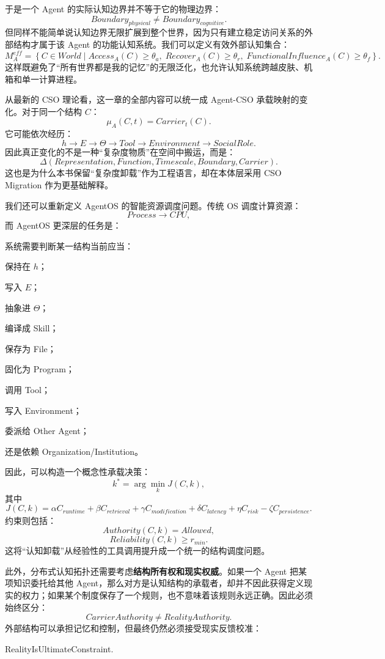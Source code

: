 于是一个 Agent 的实际认知边界并不等于它的物理边界：
\[
Boundary_{physical}
\neq
Boundary_{cognitive}.
\]
但同样不能简单说认知边界无限扩展到整个世界，因为只有建立稳定访问关系的外部结构才属于该 Agent 的功能认知系统。我们可以定义有效外部认知集合：
\[
M_A^{eff}
=
\left\{
C\in World
\mid
Access_A(C)\geq\theta_a,\;
Recover_A(C)\geq\theta_r,\;
FunctionalInfluence_A(C)\geq\theta_f
\right\}.
\]
这样既避免了``所有世界都是我的记忆''的无限泛化，也允许认知系统跨越皮肤、机箱和单一计算进程。

从最新的 CSO 理论看，这一章的全部内容可以统一成 Agent-CSO 承载映射的变化。对于同一个结构 $C$：
\[
\mu_A(C,t)
=
Carrier_t(C).
\]
它可能依次经历：
\[
h
\rightarrow
E
\rightarrow
\Theta
\rightarrow
Tool
\rightarrow
Environment
\rightarrow
SocialRole.
\]
因此真正变化的不是一种``复杂度物质''在空间中搬运，而是：
\[
\boxed{
\Delta
(
Representation,
Function,
Timescale,
Boundary,
Carrier
).
}
\]
这也是为什么本书保留``复杂度卸载''作为工程语言，却在本体层采用 CSO Migration 作为更基础解释。

我们还可以重新定义 AgentOS 的智能资源调度问题。传统 OS 调度计算资源：
\[
Process\rightarrow CPU,
\]
而 AgentOS 更深层的任务是：
\begin{statementbox}
\centering
{}
\end{statementbox}
系统需要判断某一结构当前应当：

保持在 $h$；

写入 $E$；

抽象进 $\Theta$；

编译成 Skill；

保存为 File；

固化为 Program；

调用 Tool；

写入 Environment；

委派给 Other Agent；

还是依赖 Organization/Institution。

因此，可以构造一个概念性承载决策：
\[
k^*
=
\arg\min_k
J(C,k),
\]
其中
\[
J(C,k)
=
\alpha C_{runtime}
+
\beta C_{retrieval}
+
\gamma C_{modification}
+
\delta C_{latency}
+
\eta C_{risk}
-
\zeta C_{persistence}.
\]
约束则包括：
\[
Authority(C,k)=Allowed,
\]
\[
Reliability(C,k)\geq r_{min}.
\]
这将``认知卸载''从经验性的工具调用提升成一个统一的结构调度问题。

此外，分布式认知拓扑还需要考虑\textbf{结构所有权和现实权威}。如果一个 Agent 把某项知识委托给其他 Agent，那么对方是认知结构的承载者，却并不因此获得定义现实的权力；如果某个制度保存了一个规则，也不意味着该规则永远正确。因此必须始终区分：
\[
CarrierAuthority
\neq
RealityAuthority.
\]
外部结构可以承担记忆和控制，但最终仍然必须接受现实反馈校准：
\begin{statementbox}
RealityIsUltimateConstraint.
\end{statementbox}

